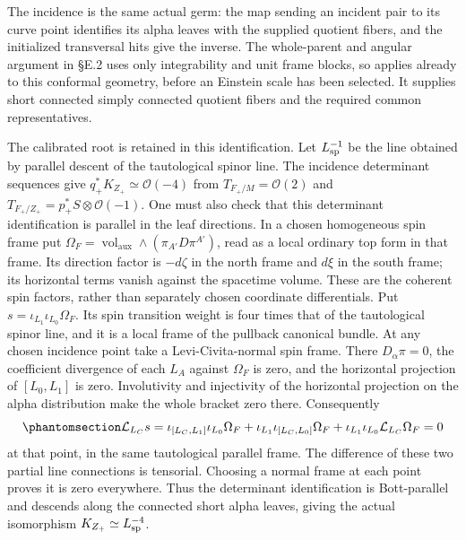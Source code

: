 \documentclass[
  english,
  11pt,
  reqno]{amsart}
\begin{document}
The incidence is the same actual germ: the map sending an incident pair
to its curve point identifies its alpha leaves with the supplied
quotient fibers, and the initialized transversal hits give the inverse.
The whole-parent and angular argument in §E.2 uses only integrability
and unit frame blocks, so applies already to this conformal geometry,
before an Einstein scale has been selected. It supplies short connected
simply connected quotient fibers and the required common
representatives.

The calibrated root is retained in this identification. Let
\(L_{\rm sp}^{-1}\) be the line obtained by parallel descent of the
tautological spinor line. The incidence determinant sequences give
\(q_+^*K_{Z_+}\simeq\mathcal O(-4)\) from \(T_{F_+/M}=\mathcal O(2)\)
and \(T_{F_+/Z_+}=p_+^*S\otimes\mathcal O(-1)\). One must also check
that this determinant identification is parallel in the leaf directions.
In a chosen homogeneous spin frame put
\(\Omega_F=\operatorname{vol}_{\mathrm{aux}}\wedge(\pi_{A'}D\pi^{A'})\),
read as a local ordinary top form in that frame. Its direction factor is
\(-d\zeta\) in the north frame and \(d\xi\) in the south frame; its
horizontal terms vanish against the spacetime volume. These are the
coherent spin factors, rather than separately chosen coordinate
differentials. Put \(s=\iota_{L_1}\iota_{L_0}\Omega_F\). Its spin
transition weight is four times that of the tautological spinor line,
and it is a local frame of the pullback canonical bundle. At any chosen
incidence point take a Levi-Civita-normal spin frame. There
\(D_\alpha\pi=0\), the coefficient divergence of each \(L_A\) against
\(\Omega_F\) is zero, and the horizontal projection of \([L_0,L_1]\) is
zero. Involutivity and injectivity of the horizontal projection on the
alpha distribution make the whole bracket zero there. Consequently
\begin{equation}\protect\phantomsection\label{eq:gg-spin-determinant-bott-descent}{
 \mathcal L_{L_C}s
 =\iota_{[L_C,L_1]}\iota_{L_0}\Omega_F
  +\iota_{L_1}\iota_{[L_C,L_0]}\Omega_F
  +\iota_{L_1}\iota_{L_0}\mathcal L_{L_C}\Omega_F=0
}\end{equation} at that point, in the same tautological parallel frame.
The difference of these two partial line connections is tensorial.
Choosing a normal frame at each point proves it is zero everywhere. Thus
the determinant identification is Bott-parallel and descends along the
connected short alpha leaves, giving the actual isomorphism
\(K_{Z_+}\simeq L_{\rm sp}^{-4}\).
\end{document}
